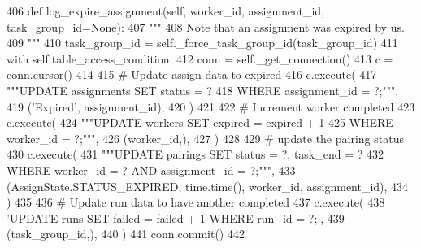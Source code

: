 \begin{DoxyCode}
406     \textcolor{keyword}{def }log\_expire\_assignment(self, worker\_id, assignment\_id, task\_group\_id=None):
407         \textcolor{stringliteral}{"""}
408 \textcolor{stringliteral}{        Note that an assignment was expired by us.}
409 \textcolor{stringliteral}{        """}
410         task\_group\_id = self.\_force\_task\_group\_id(task\_group\_id)
411         with self.table\_access\_condition:
412             conn = self.\_get\_connection()
413             c = conn.cursor()
414 
415             \textcolor{comment}{# Update assign data to expired}
416             c.execute(
417                 \textcolor{stringliteral}{"""UPDATE assignments SET status = ?}
418 \textcolor{stringliteral}{                         WHERE assignment\_id = ?;"""},
419                 (\textcolor{stringliteral}{'Expired'}, assignment\_id),
420             )
421 
422             \textcolor{comment}{# Increment worker completed}
423             c.execute(
424                 \textcolor{stringliteral}{"""UPDATE workers SET expired = expired + 1}
425 \textcolor{stringliteral}{                         WHERE worker\_id = ?;"""},
426                 (worker\_id,),
427             )
428 
429             \textcolor{comment}{# update the pairing status}
430             c.execute(
431                 \textcolor{stringliteral}{"""UPDATE pairings SET status = ?, task\_end = ?}
432 \textcolor{stringliteral}{                         WHERE worker\_id = ? AND assignment\_id = ?;"""},
433                 (AssignState.STATUS\_EXPIRED, time.time(), worker\_id, assignment\_id),
434             )
435 
436             \textcolor{comment}{# Update run data to have another completed}
437             c.execute(
438                 \textcolor{stringliteral}{'UPDATE runs SET failed = failed + 1 WHERE run\_id = ?;'},
439                 (task\_group\_id,),
440             )
441             conn.commit()
442 
\end{DoxyCode}
\mbox{\label{classparlai_1_1mturk_1_1core_1_1legacy__2018_1_1mturk__data__handler_1_1MTurkDataHandler_ad886593bc60aab7174f9aa255f2ab5a5}} 
